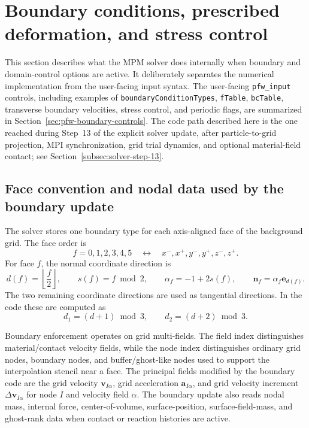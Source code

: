 \section{Boundary conditions, prescribed deformation, and stress control}
\label{sec:bc-internals}

This section describes what the MPM solver does internally when boundary and domain-control options are active.  It deliberately separates the numerical implementation from the user-facing input syntax.  The user-facing \texttt{pfw\_input} controls, including examples of \texttt{boundaryConditionTypes}, \texttt{fTable}, \texttt{bcTable}, transverse boundary velocities, stress control, and periodic flags, are summarized in Section~\ref{sec:pfw-boundary-controls}.  The code path described here is the one reached during Step~13 of the explicit solver update, after particle-to-grid projection, MPI synchronization, grid trial dynamics, and optional material-field contact; see Section~\ref{subsec:solver-step-13}.

\subsection{Face convention and nodal data used by the boundary update}
\label{subsec:bc-face-convention}

The solver stores one boundary type for each axis-aligned face of the background grid.  The face order is
\begin{equation}
  f=0,1,2,3,4,5
  \quad\leftrightarrow\quad
  x^-,x^+,y^-,y^+,z^-,z^+.
\end{equation}
For face $f$, the normal coordinate direction is
\begin{equation}
  d(f)=\left\lfloor \frac{f}{2}\right\rfloor,
  \qquad
  s(f)=f\bmod 2,
  \qquad
  \alpha_f=-1+2s(f),
  \qquad
  \mathbf{n}_f=\alpha_f\mathbf{e}_{d(f)}.
  \label{eq:bc-face-normal}
\end{equation}
The two remaining coordinate directions are used as tangential directions.  In the code these are computed as
\begin{equation}
  d_1=(d+1)\bmod 3,
  \qquad
  d_2=(d+2)\bmod 3.
\end{equation}

Boundary enforcement operates on grid multi-fields.  The field index distinguishes material/contact velocity fields, while the node index distinguishes ordinary grid nodes, boundary nodes, and buffer/ghost-like nodes used to support the interpolation stencil near a face.  The principal fields modified by the boundary code are the grid velocity $\mathbf{v}_{I\alpha}$, grid acceleration $\mathbf{a}_{I\alpha}$, and grid velocity increment $\Delta\mathbf{v}_{I\alpha}$ for node $I$ and velocity field $\alpha$.  The boundary update also reads nodal mass, internal force, center-of-volume, surface-position, surface-field-mass, and ghost-rank data when contact or reaction histories are active.

